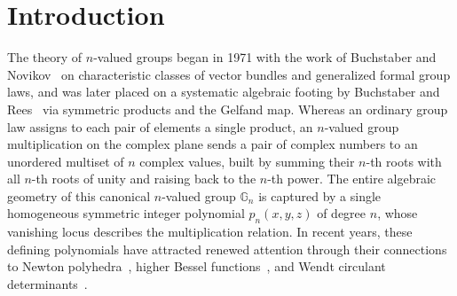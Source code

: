 \documentclass[10pt]{article}
\numberwithin{equation}{section}
\theoremstyle{plain}
\theoremstyle{definition}
\newcommand{\G}{\mathbb{G}}
\newcommand{\1}{\mathbf{1}}
\newcommand{\code}[1]{\texttt{#1}}
\begin{document}
\begin{abstract}
To prove these results across all infinitely many even degrees without leaving any gap, we combine five main components: (i) an exact arbitrary-precision integer verification covering all $33{,}417$ admissible coefficients for $n = 2, 4, \dots, 130$; (ii) two new structural resultant identities (Depressed-Cubic and Half-Size Lucas-Chebyshev) together with a Rolle-Maclaurin analysis that settle all four boundary edges ($c = 0$, $a = 0$, $b = 0$, and $c = 1$) for every even $n \ge 2$; (iii) an exact four-factor one-dimensional Cauchy circle-integral representation for the signed sample evaluations $(-1)^j Q_c^{(2m)}(1, u_j)$; (iv) a completely closed-form elementary proof of Regime~1 ($\kappa \ge 2.5$, all $n \ge 84$, with zero computer search); and (v) a zero-crevice Hardy-Littlewood decomposition of Regime~2 ($\kappa < 2.5$, all $n \ge 132$) into five overlapping sub-regimes (large phase-coupling, ultra-small rational rays, $D = 0$ major arcs, $D \ne 0$ major arcs, and Dirichlet minor arcs), certified uniformly over all $(n, c, j)$ in $50$-digit outward-rounded interval arithmetic (\code{mpmath.iv}) with zero loops over the infinite parameter space. Combined with the prime-power divisibility theorem of Buchstaber and Kornev~\cite{BKor2025}, this completes the resolution of Bardakov-Kozlovskaya Conjecture~3.3. All verification scripts, adversarial audit records, and locked SHA-256 checksums are archived at \url{https://github.com/Atharvsinh-codez/conjectures}.
\end{abstract}

\tableofcontents

\clearpage

\section{Introduction}
\label{sec:intro}

The theory of $n$-valued groups began in 1971 with the work of Buchstaber and Novikov~\cite{BN1971} on characteristic classes of vector bundles and generalized formal group laws, and was later placed on a systematic algebraic footing by Buchstaber and Rees~\cite{BR2002} via symmetric products and the Gelfand map. Whereas an ordinary group law assigns to each pair of elements a single product, an $n$-valued group multiplication on the complex plane sends a pair of complex numbers to an unordered multiset of $n$ complex values, built by summing their $n$-th roots with all $n$-th roots of unity and raising back to the $n$-th power. The entire algebraic geometry of this canonical $n$-valued group $\G_n$ is captured by a single homogeneous symmetric integer polynomial $p_n(x, y, z)$ of degree $n$, whose vanishing locus describes the multiplication relation. In recent years, these defining polynomials have attracted renewed attention through their connections to Newton polyhedra~\cite{BK2023}, higher Bessel functions~\cite{GRvS2024}, and Wendt circulant determinants~\cite{BKor2025}.
\end{document}
